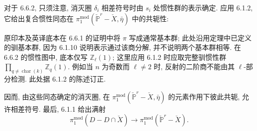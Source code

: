 对于 6.6.2, 只须注意, 消灭圈 $\delta_i$ 相差符号时由 $s_i$ 处惯性群的表示确定. 应用 6.1.2, 它给出复合惯性同态在 $\pi_1^{\mathrm{mod}}(\check{\mathbb P}^{r}-\check X,\bar\eta)$ 中的共轭性:
\begin{center}
\end{center}
\begin{editorialnote}
原印本及英译底本在 6.6.1 的证明中将 $\pi$ 写成通常基本群; 此处沿用定理中已定义的驯基本群, 因为 6.1.10 说明表示通过该商分解, 并不说明两个基本群相等. 在 6.6.2 的惯性图中, 底本仅写 $\mathbb Z_\ell(1)$; 这里应用 6.1.2 时应取完整驯惯性群 $\prod_{q\ne\operatorname{char}(k)}\mathbb Z_q(1)$. 例如当 $n$ 为奇数而 $\ell\ne2$ 时, 反射的二阶商不能由其 $\ell$-部分检测. 此处据 6.1.2 的陈述订正.
\end{editorialnote}

因而, 由这些同态确定的消灭圈, 在 $\pi_1^{\mathrm{mod}}(\check{\mathbb P}^{r}-\check X,\bar\eta)$ 的元素作用下彼此共轭, 允许相差符号. 最后, 6.1.1 给出满射
\[
\pi_1^{\mathrm{mod}}(D-D\cap\check X)
\longrightarrow
\pi_1^{\mathrm{mod}}(\check{\mathbb P}^{r}-\check X).
\]

